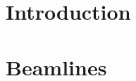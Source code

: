 \documentclass[a4paper,10pt]{article}
\newcommand{\Mimosa}{\ensuremath{\textrm{MIMOSA\,26}}}
\newcommand{\eudet}{\ensuremath{\textrm{EUDET}}}
\newcommand*{\notFOREPJ}{}%
\begin{document}
%  

\ifdefined\notFOREPJ
\tableofcontents
\else
\fi


\section{Introduction}
\label{sec:intro}
\ifdefined\notFOREPJ

\else

\fi

\section{Beamlines}
\label{sec:beamlines}
\ifdefined\notFOREPJ

\else

\fi
\end{document}
